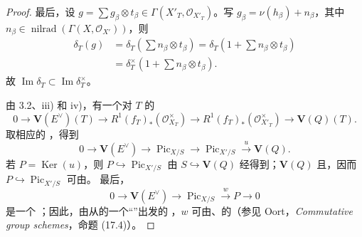 \begin{proof}
最后，设 $g=\sum g_\beta\otimes t_\beta\in\Gamma(X'_T,\mathcal O_{X'_T})$。写 $g_\beta=\nu(h_\beta)+n_\beta$，其中 $n_\beta\in\operatorname{nilrad}(\Gamma(X,\mathcal O_{X'}))$，则
\[
\begin{aligned}
\delta_T(g)&=\delta_T\left(\sum n_\beta\otimes t_\beta\right)
=\delta_T\left(1+\sum n_\beta\otimes t_\beta\right)\\
&=\delta_T^{\times}\left(1+\sum n_\beta\otimes t_\beta\right).
\end{aligned}
\]
故 $\operatorname{Im}\delta_T\subset\operatorname{Im}\delta_T^{\times}$。

由 3.2、iii) 和 iv)，有一个对 $T$ 的
\[
0\longrightarrow\mathbf V(E^\vee)(T)\longrightarrow R^1(f_T)_*(\mathcal O_{X_T}^{\times})
\longrightarrow R^1(f_T)_*(\mathcal O_{X'_T}^{\times})\longrightarrow\mathbf V(Q)(T).
\]
取相应的  ，得到
\[
0\longrightarrow\mathbf V(E^\vee)\longrightarrow\operatorname{Pic}_{X/S}
\longrightarrow\operatorname{Pic}_{X'/S}\xrightarrow{u}\mathbf V(Q).
\]
若 $P=\operatorname{Ker}(u)$，则 $P\hookrightarrow\operatorname{Pic}_{X'/S}$ 由 $S\hookrightarrow\mathbf V(Q)$ 经得到；$\mathbf V(Q)$ 且，因而 $P\hookrightarrow\operatorname{Pic}_{X'/S}$ 可由。
最后，
\[
0\longrightarrow\mathbf V(E^\vee)\longrightarrow\operatorname{Pic}_{X/S}\xrightarrow{w}P\longrightarrow0
\]
是一个  ；因此，由从的一个“”出发的 ，$w$ 可由、的（参见 Oort，\emph{Commutative group schemes}，命题 (17.4)）。
\end{proof}

